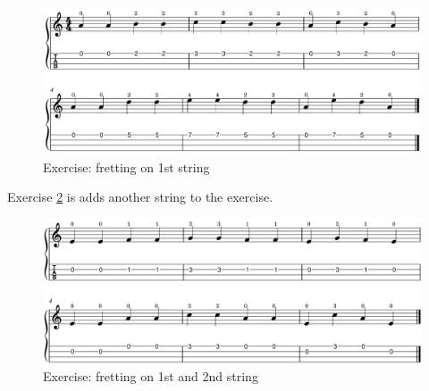 \begin{figure}[h]
    \centering
    \includegraphics[width=\textwidth]{../MuseScore/Ukulele/UkuleleExerciseFirstStringFretting.png}
    \caption{Exercise: fretting on 1st string}
    \label{fig:ukulele_exercise_fretting_fingering_first_string}
\end{figure}

Exercise \ref{fig:ukulele_exercise_fretting_fingering_first_and_second_string} is adds another string to the exercise.

\begin{figure}[h]
	\centering
	\includegraphics[width=\textwidth]{../MuseScore/Ukulele/UkuleleExerciseTwoStringFretting.png}
	\caption{Exercise: fretting on 1st and 2nd string}
	\label{fig:ukulele_exercise_fretting_fingering_first_and_second_string}
\end{figure}